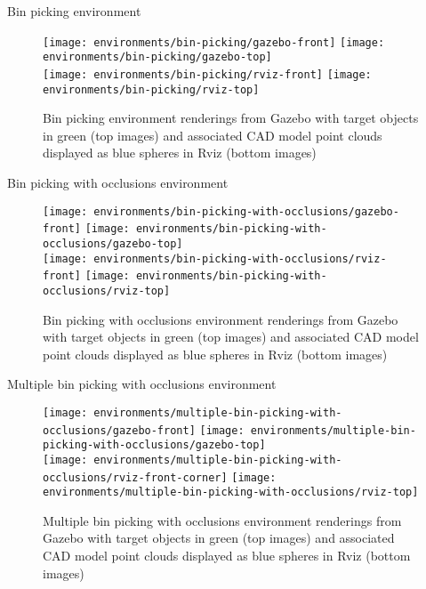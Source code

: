 \begin{frame}{Bin picking environment}
	\begin{figure}
		\centering
		\texttt{[image: environments/bin-picking/gazebo-front]}
		\texttt{[image: environments/bin-picking/gazebo-top]}\\
		\texttt{[image: environments/bin-picking/rviz-front]}
		\texttt{[image: environments/bin-picking/rviz-top]}
		\caption{Bin picking environment renderings from Gazebo with target objects in green (top images) and associated CAD model point clouds displayed as blue spheres in Rviz (bottom images)}
	\end{figure}
\end{frame}


\begin{frame}{Bin picking with occlusions environment}
	\begin{figure}
		\centering
		\texttt{[image: environments/bin-picking-with-occlusions/gazebo-front]}
		\texttt{[image: environments/bin-picking-with-occlusions/gazebo-top]}\\
		\texttt{[image: environments/bin-picking-with-occlusions/rviz-front]}
		\texttt{[image: environments/bin-picking-with-occlusions/rviz-top]}
		\caption{Bin picking with occlusions environment renderings from Gazebo with target objects in green (top images) and associated CAD model point clouds displayed as blue spheres in Rviz (bottom images)}
	\end{figure}
\end{frame}


\begin{frame}{Multiple bin picking with occlusions environment}
	\begin{figure}
		\centering
		\texttt{[image: environments/multiple-bin-picking-with-occlusions/gazebo-front]}
		\texttt{[image: environments/multiple-bin-picking-with-occlusions/gazebo-top]}\\
		\texttt{[image: environments/multiple-bin-picking-with-occlusions/rviz-front-corner]}
		\texttt{[image: environments/multiple-bin-picking-with-occlusions/rviz-top]}
		\caption{Multiple bin picking with occlusions environment renderings from Gazebo with target objects in green (top images) and associated CAD model point clouds displayed as blue spheres in Rviz (bottom images)}
	\end{figure}
\end{frame}
